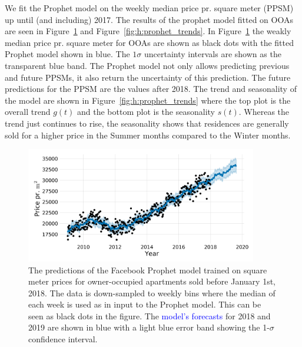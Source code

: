 We fit the Prophet model on the weekly median price pr. square meter (PPSM) up until (and including) \num{2017}. The results of the prophet model fitted on OOAs are seen in Figure~\ref{fig:h:prophet_forecast} and Figure~\ref{fig:h:prophet_trends}. In Figure~\ref{fig:h:prophet_forecast} the weakly median price pr. square meter for OOAs are shown as black dots with the fitted Prophet model shown in blue. The $1\sigma$ uncertainty intervals are shown as the transparent blue band. The Prophet model not only allows predicting previous and future PPSMs, it also return the uncertainty of this prediction. The future predictions for the PPSM are the values after 2018. The trend and seasonality of the model are shown in Figure~\ref{fig:h:prophet_trends} where the top plot is the overall trend $g(t)$ and the bottom plot is the seasonality $s(t)$. Whereas the trend just continues to rise, the seasonality shows that residences are generally sold for a higher price in the Summer months compared to the Winter months. 

\begin{figure}
  \includegraphics[draft=false, width=0.9\textwidth, trim=15 15 15 15, clip]{figures/housing/Ejerlejlighed_v18_cut_all_Ncols_all_prophet_forecast.png}
  \caption[Prophet Forecast for apartments]
          {The predictions of the Facebook Prophet model trained on square meter prices for owner-occupied apartments sold before January 1st, 2018. The data is down-sampled to weekly bins where the median of each week is used as in input to the Prophet model. This can be seen as black dots in the figure. The \textcolor{blue}{model's forecasts} for 2018 and 2019 are shown in blue with a light blue \textcolor{light-blue}{error band} showing the \num{1}-$\sigma$ confidence interval.
          }
  \label{fig:h:prophet_forecast}
\end{figure}

